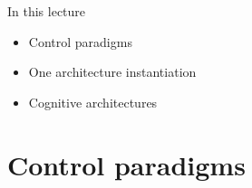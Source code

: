 \documentclass[compress]{beamer}
\begin{document}
\begin{frame}{In this lecture}

\begin{itemize}
    \item<+-> Control paradigms
    \item<+-> One architecture instantiation
    \item<+-> Cognitive architectures
\end{itemize}

\end{frame}




\section{Control paradigms}
\end{document}
